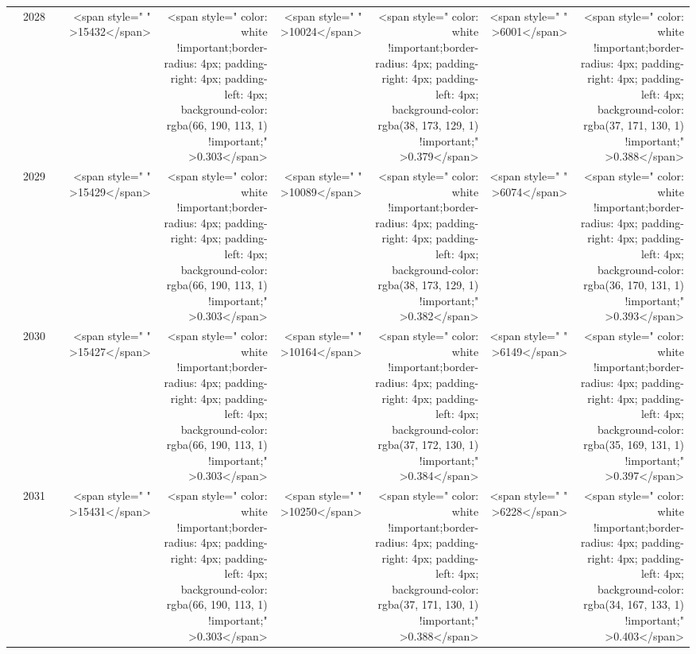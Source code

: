 \begin{table}
\begin{tabular}[t]{>{}l|l>{}rr>{}r|rrrr}
 & 2028 & \cellcolor[HTML]{848279}{\textcolor{white}{702}} & <span style="     " >15432</span> & <span style="     color: white !important;border-radius: 4px; padding-right: 4px; padding-left: 4px; background-color: rgba(66, 190, 113, 1) !important;" >0.303</span> & <span style="     " >10024</span> & <span style="     color: white !important;border-radius: 4px; padding-right: 4px; padding-left: 4px; background-color: rgba(38, 173, 129, 1) !important;" >0.379</span> & <span style="     " >6001</span> & <span style="     color: white !important;border-radius: 4px; padding-right: 4px; padding-left: 4px; background-color: rgba(37, 171, 130, 1) !important;" >0.388</span>\\

 & 2029 & \cellcolor[HTML]{848179}{\textcolor{white}{703}} & <span style="     " >15429</span> & <span style="     color: white !important;border-radius: 4px; padding-right: 4px; padding-left: 4px; background-color: rgba(66, 190, 113, 1) !important;" >0.303</span> & <span style="     " >10089</span> & <span style="     color: white !important;border-radius: 4px; padding-right: 4px; padding-left: 4px; background-color: rgba(38, 173, 129, 1) !important;" >0.382</span> & <span style="     " >6074</span> & <span style="     color: white !important;border-radius: 4px; padding-right: 4px; padding-left: 4px; background-color: rgba(36, 170, 131, 1) !important;" >0.393</span>\\

 & 2030 & \cellcolor[HTML]{858379}{\textcolor{white}{700}} & <span style="     " >15427</span> & <span style="     color: white !important;border-radius: 4px; padding-right: 4px; padding-left: 4px; background-color: rgba(66, 190, 113, 1) !important;" >0.303</span> & <span style="     " >10164</span> & <span style="     color: white !important;border-radius: 4px; padding-right: 4px; padding-left: 4px; background-color: rgba(37, 172, 130, 1) !important;" >0.384</span> & <span style="     " >6149</span> & <span style="     color: white !important;border-radius: 4px; padding-right: 4px; padding-left: 4px; background-color: rgba(35, 169, 131, 1) !important;" >0.397</span>\\

 & 2031 & \cellcolor[HTML]{888579}{\textcolor{white}{696}} & <span style="     " >15431</span> & <span style="     color: white !important;border-radius: 4px; padding-right: 4px; padding-left: 4px; background-color: rgba(66, 190, 113, 1) !important;" >0.303</span> & <span style="     " >10250</span> & <span style="     color: white !important;border-radius: 4px; padding-right: 4px; padding-left: 4px; background-color: rgba(37, 171, 130, 1) !important;" >0.388</span> & <span style="     " >6228</span> & <span style="     color: white !important;border-radius: 4px; padding-right: 4px; padding-left: 4px; background-color: rgba(34, 167, 133, 1) !important;" >0.403</span>\\


\end{tabular}
\end{table}
